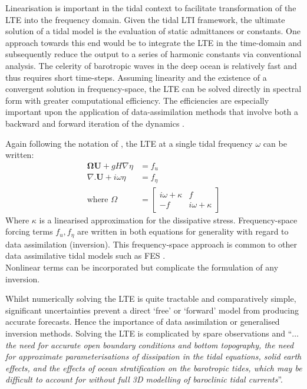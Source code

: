 Linearisation is important in the tidal context to facilitate transformation of the LTE into the frequency domain.   Given the tidal LTI framework, the ultimate solution of a tidal model is the evaluation of static admittances or constants.   One approach towards this end would be to integrate the LTE in the time-domain and subsequently reduce the output to a series of harmonic constants via conventional analysis.   The celerity of barotropic waves in the deep ocean is relatively fast and thus requires short time-steps.   Assuming linearity and the existence of a convergent solution in frequency-space, the LTE can be solved directly in spectral form with greater computational efficiency.   The efficiencies are especially important upon the application of data-assimilation methods that involve both a backward and forward iteration of the dynamics \cite[pp184]{Egbert:2002ug}.


Again following the notation of \cite[pp186]{Egbert:2002ug}, the LTE at a single tidal frequency $\omega$ can be written:
\begin{align}
\label{E:LTE_momtm_w}
\mathbf{\Omega} \mathbf{U} + gH\nabla \eta &= f_u \\
\label{E:LTE_cont_w}
\nabla.\mathbf{U} + i\omega\eta &= f_\eta\\
\mbox{where   } \Omega             &=
\left[ \begin{array}{cc} 
      i\omega + \kappa & f \\ 
       -f              & i\omega + \kappa  
                        \end{array} \right]   \nonumber
\end{align}
Where $\kappa$ is a linearised approximation for the dissipative stress.   Frequency-space forcing terms $f_u, f_\eta$ are written in both equations for generality with regard to data assimilation (inversion).  This frequency-space approach is common to other data assimilative tidal models such as FES \cite[pp395]{Lyard:2006ir}.\\
Nonlinear terms can be incorporated but complicate the formulation of any inversion.


Whilst numerically solving the LTE is quite tractable and comparatively simple, significant uncertainties prevent a direct `free' or `forward' model from producing accurate forecasts.  Hence the importance of data assimilation or generalised inversion methods.  Solving the LTE is complicated by spare observations and ``\textit{$\dots$ the need for accurate open boundary conditions and bottom topography, the need for approximate parameterisations of dissipation in the tidal equations, solid earth effects, and the effects of ocean stratification on the barotropic tides, which may be difficult to account for without full 3D modelling of baroclinic tidal currents}''\citep[183]{Egbert:2002ug}.

